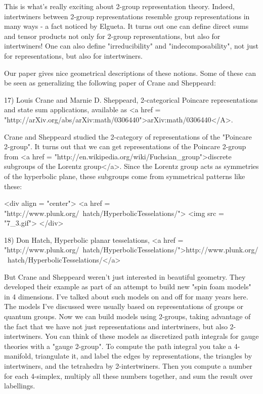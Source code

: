 This is what's really exciting about 2-group representation theory.
Indeed, intertwiners between 2-group representations resemble group
representations in many ways - a fact noticed by Elgueta.  It turns
out one can define direct sums and tensor products not only for
2-group representations, but also for intertwiners!  One can also
define "irreducibility" and "indecomposability",
not just for representations, but also for intertwiners.

Our paper gives nice geometrical descriptions of these notions.
Some of these can be seen as generalizing the following paper 
of Crane and Sheppeard:

17) Louis Crane and Marnie D. Sheppeard, 2-categorical Poincare
representations and state sum applications, available as
<a href = "http://arXiv.org/abs/arXiv:math/0306440">arXiv:math/0306440</A>.

Crane and Sheppeard studied the 2-category of representations of the
"Poincare 2-group".  It turns out that we can get
representations of the Poincare 2-group from 
<a href = "http://en.wikipedia.org/wiki/Fuchsian_group">discrete 
subgroups of the Lorentz group</a>.  Since the Lorentz group acts 
as symmetries of the hyperbolic plane, these subgroups come from 
symmetrical patterns like these:


<div align = "center">
<a href = "http://www.plunk.org/~hatch/HyperbolicTesselations/">
<img src = "7_3.gif">
</div>


18) Don Hatch, Hyperbolic planar tesselations, 
<a href = "http://www.plunk.org/~hatch/HyperbolicTesselations/">http://www.plunk.org/~hatch/HyperbolicTesselations/</a>

But Crane and Sheppeard weren't just interested in beautiful geometry.
They developed their example as part of an attempt to build new
"spin foam models" in 4 dimensions.  I've talked about such
models on and off for many years here.  The models I've discussed were
usually based on representations of groups or quantum groups.  Now we
can build models using 2-groups, taking advantage of the fact that we
have not just representations and intertwiners, but also
2-intertwiners.  You can think of these models as discretized path
integrals for gauge theories with a "gauge 2-group".  To
compute the path integral you take a 4-manifold, triangulate it, and
label the edges by representations, the triangles by intertwiners, and
the tetrahedra by 2-intertwiners.  Then you compute a number for each
4-simplex, multiply all these numbers together, and sum the result
over labellings.

